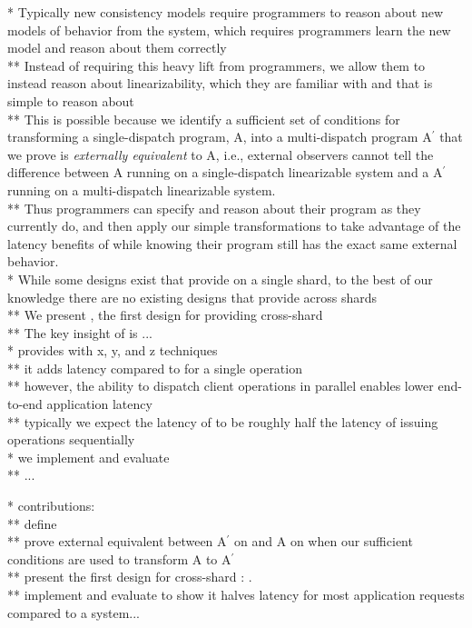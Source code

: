 * Typically new consistency models require programmers to reason about new models of behavior from the system, which requires programmers learn the new model and reason about them correctly\\
** Instead of requiring this heavy lift from programmers, we allow them to instead reason about linearizability, which they are familiar with and that is simple to reason about\\
** This is possible because we identify a sufficient set of conditions for transforming a single-dispatch program, A, into a multi-dispatch program A$^\prime$ that we prove is \textit{externally equivalent} to A, i.e., external observers cannot tell the difference between A running on a single-dispatch linearizable system and a A$^\prime$ running on a multi-dispatch linearizable system.\\
** Thus programmers can specify and reason about their program as they currently do, and then apply our simple transformations to take advantage of the latency benefits of \mdl{} while knowing their program still has the exact same external behavior.\\


* While some designs exist that provide \mdl on a single shard, to the best of our knowledge there are no existing designs that provide \mdl across shards\\
** We present \sys{}, the first design for providing cross-shard \mdl{}\\
** The key insight of \sys is ...\\

* \sys{} provides \mdl with x, y, and z techniques\\
** it adds latency compared to \sdl for a single operation\\
** however, the ability to dispatch client operations in parallel enables lower end-to-end application latency\\
** typically we expect the latency of \mdl to be roughly half the latency of \sdl issuing operations sequentially\\

* we implement and evaluate \sys{}\\
** ...

* contributions:\\
** define \mdl{}\\
** prove external equivalent between A$^\prime$ on \mdl{} and A on \sdl{} when our sufficient conditions are used to transform A to A$^\prime$\\
** present the first design for cross-shard \mdl{}: \sys{}.\\
** implement and evaluate \sys{} to show it halves latency for most application requests compared to a \sdl system...\\
